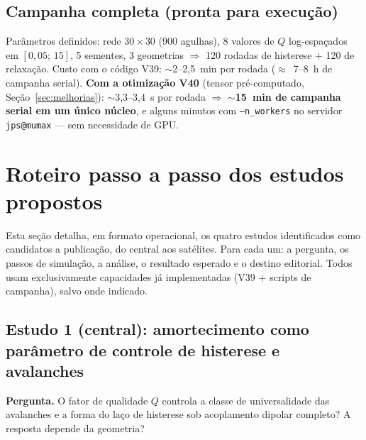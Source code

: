 \documentclass[11pt,a4paper]{article}
\newcommand{\code}[1]{\texttt{#1}}
\begin{document}
\subsection{Campanha completa (pronta para execução)}

Parâmetros definidos: rede $30\times30$ (900 agulhas), 8 valores de $Q$
log-espaçados em $[0{,}05;\,15]$, 5 sementes, 3 geometrias
$\Rightarrow$ 120 rodadas de histerese + 120 de relaxação. Custo com o
código V39: $\sim$2--2{,}5~min por rodada ($\approx$~7--8~h de campanha
serial). \textbf{Com a otimização V40} (tensor pré-computado,
Seção~\ref{sec:melhorias}): $\sim$3{,}3--3{,}4~s por rodada
$\Rightarrow$ \textbf{$\sim$15~min de campanha serial em um único
núcleo}, e alguns minutos com \code{--n\_workers} no servidor
\code{jps@mumax} --- sem necessidade de GPU.

\section{Roteiro passo a passo dos estudos propostos}
\label{sec:roteiro}

Esta seção detalha, em formato operacional, os quatro estudos
identificados como candidatos a publicação, do central aos satélites.
Para cada um: a pergunta, os passos de simulação, a análise, o resultado
esperado e o destino editorial. Todos usam exclusivamente capacidades já
implementadas (V39 + scripts de campanha), salvo onde indicado.

\subsection{Estudo 1 (central): amortecimento como parâmetro de
controle de histerese e avalanches}

\textbf{Pergunta.} O fator de qualidade $Q$ controla a classe de
universalidade das avalanches e a forma do laço de histerese sob
acoplamento dipolar completo? A resposta depende da geometria?
\end{document}
